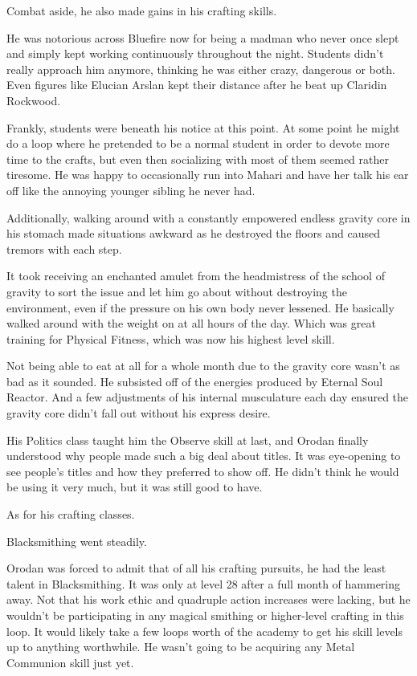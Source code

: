 \documentclass[a4paper,10pt]{book}
\begin{document}
Combat aside, he also made gains in his crafting skills.\par
He was notorious across Bluefire now for being a madman who never once slept and simply kept working continuously throughout the night. Students didn’t really approach him anymore, thinking he was either crazy, dangerous or both. Even figures like Elucian Arslan kept their distance after he beat up Claridin Rockwood.\par
Frankly, students were beneath his notice at this point. At some point he might do a loop where he pretended to be a normal student in order to devote more time to the crafts, but even then socializing with most of them seemed rather tiresome. He was happy to occasionally run into Mahari and have her talk his ear off like the annoying younger sibling he never had.\par
Additionally, walking around with a constantly empowered endless gravity core in his stomach made situations awkward as he destroyed the floors and caused tremors with each step.\par
It took receiving an enchanted amulet from the headmistress of the school of gravity to sort the issue and let him go about without destroying the environment, even if the pressure on his own body never lessened. He basically walked around with the weight on at all hours of the day. Which was great training for Physical Fitness, which was now his highest level skill.\par
Not being able to eat at all for a whole month due to the gravity core wasn’t as bad as it sounded. He subsisted off of the energies produced by Eternal Soul Reactor. And a few adjustments of his internal musculature each day ensured the gravity core didn’t fall out without his express desire.\par
His Politics class taught him the Observe skill at last, and Orodan finally understood why people made such a big deal about titles. It was eye-opening to see people's titles and how they preferred to show off. He didn't think he would be using it very much, but it was still good to have.\par
As for his crafting classes.\par
Blacksmithing went steadily.\par
Orodan was forced to admit that of all his crafting pursuits, he had the least talent in Blacksmithing. It was only at level 28 after a full month of hammering away. Not that his work ethic and quadruple action increases were lacking, but he wouldn’t be participating in any magical smithing or higher-level crafting in this loop. It would likely take a few loops worth of the academy to get his skill levels up to anything worthwhile. He wasn’t going to be acquiring any Metal Communion skill just yet.\par
\end{document}
